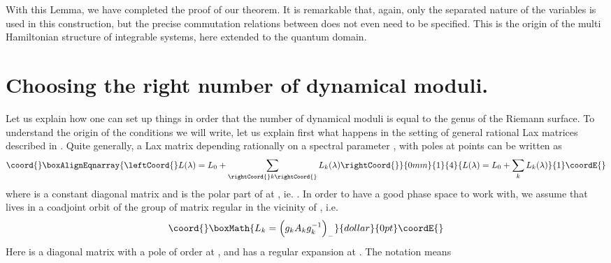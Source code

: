 \documentclass[a4paper,11pt]{article}
\begin{document}
With this Lemma, we have completed the proof of our theorem. 
It is remarkable that, again, only the separated nature of the variables \coordHE{}
is used in this construction, but the precise commutation relations between 
\coordHE{} does not even need to be specified. This is the origin of 
the multi Hamiltonian structure of integrable systems, here extended to the quantum
domain.



\section{Choosing the right number of dynamical moduli.}

Let us explain how one can set up things in order that 
the number of dynamical moduli is equal to the genus of the Riemann surface.
To understand the origin  of the conditions we will write, 
let us explain  first what happens in the setting of general rational Lax matrices
described in \cite{BaTa99,BaBeTa03}.
Quite generally, a Lax matrix \coordHE{} depending 
 rationally on a spectral parameter \myHighlight{$\lambda$}\coordHE{}, with poles at points \coordHE{}
can be written as
\begin{eqnarray}\coord{}\boxAlignEqnarray{\leftCoord{}
L(\lambda) = L_0 + \sum_{\rightCoord{}k\rightCoord{}} L_k(\lambda) 
\label{laxmatrix}
\rightCoord{}}{0mm}{1}{4}{
L(\lambda) = L_0 + \sum_{k} L_k(\lambda) 
}{1}\coordE{}\end{eqnarray}
where \coordHE{} is a constant diagonal matrix and
\coordHE{} is
the polar part of \coordHE{} at \coordHE{}, ie. \coordHE{}.  
In order to have a good phase space to work with, we  assume that \coordHE{} 
lives in a coadjoint orbit of the group of \coordHE{} matrix regular in the vicinity of
\coordHE{}, i.e.
$$\coord{}\boxMath{
L_k = \Big(g_k A_k g_k^{-1}\Big)_-
}{dollar}{0pt}\coordE{}$$
Here  \coordHE{} is a diagonal matrix with a pole of order
\coordHE{} at \coordHE{}, and \coordHE{} has a regular expansion at \coordHE{}.  The notation \myHighlight{$()_-$}\coordHE{} means
\end{document}
